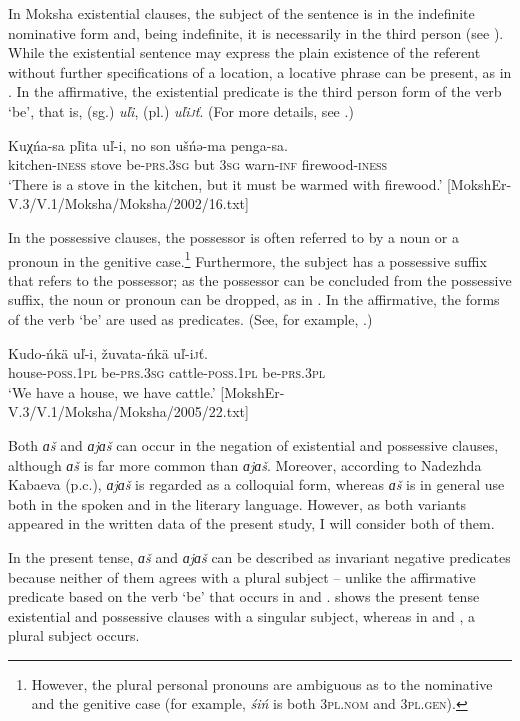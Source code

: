 \documentclass[output=paper]{langsci/langscibook}
\begin{document}
  In Moksha existential clauses, the subject of the sentence is in the indefinite nominative form and, being indefinite, it is necessarily in the third person (see ). While the existential sentence may express the plain existence of the referent without further specifications of a location, a locative phrase can be present, as in . In the affirmative, the existential predicate is the third person form of the verb `be', that is, (sg.) \textit{uľi}, (pl.) \textit{uľi\textsc{j}ť}. (For more details, see \citealt[47--52]{Hamari2007}.)

\ea\label{ex:moksha-stove}
\gll Kuχńa-sa pľita uľ-i, no son ušńə-ma penga-sa.\\
kitchen-\textsc{iness} stove be-\textsc{prs.3sg} but \textsc{3sg} warn-\textsc{inf} firewood-\textsc{iness}\\
\glt `There is a stove in the kitchen, but it must be warmed with firewood.' [MokshEr-V.3/V.1/Moksha/Moksha/2002/16.txt]
\z

	In the possessive clauses, the possessor is often referred to by a noun or a pronoun in the genitive case.\footnote{However, the plural personal pronouns are ambiguous as to the nominative and the genitive case (for example, \textit{śiń} is both \textsc{3pl.nom} and 3\textsc{pl.gen}).} Furthermore, the subject has a possessive suffix that refers to the possessor; as the possessor can be concluded from the possessive suffix, the noun or pronoun can be dropped, as in . In the affirmative, the forms of the verb `be' are used as predicates. (See, for example, \citealt[52--57]{Hamari2007}.)

\ea\label{ex:moksha-cattle}
\gll Kudo-ńkä uľ-i, žuvata-ńkä uľ-i\textsc{j}ť.\\
house-\textsc{poss.1pl} be-\textsc{prs.3sg} cattle-\textsc{poss.1pl} be-\textsc{prs.3pl}\\
\glt `We have a house, we have cattle.' [MokshEr-V.3/V.1/Moksha/Moksha/2005/22.txt]
\z

  Both \textit{ɑš} and \textit{ɑjɑš} can occur in the negation of existential and possessive clauses, although \textit{ɑš} is far more common than \textit{ɑjɑš}. Moreover, according to Nadezhda Kabaeva (p.c.), \textit{ɑjɑš} is regarded as a colloquial form, whereas \textit{ɑš} is in general use both in the spoken and in the literary language. However, as both variants appeared in the written data of the present study, I will consider both of them.

  In the present tense, \textit{ɑš} and \textit{ɑjɑš} can be described as invariant negative predicates because neither of them agrees with a plural subject -- unlike the affirmative predicate based on the verb `be' that occurs in  and .  shows the present tense existential and possessive clauses with a singular subject, whereas in  and , a plural subject occurs.
\end{document}
